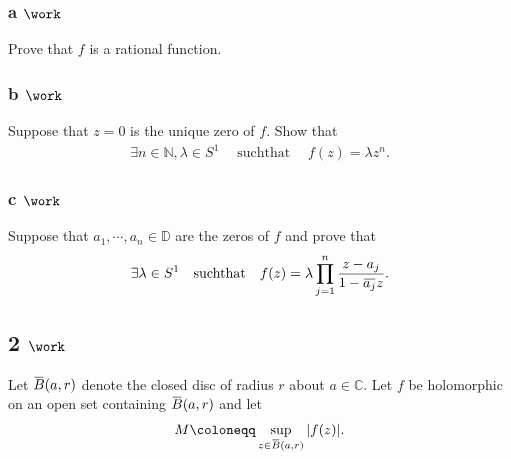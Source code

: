 \hypertarget{a-work-5}{%
\subsubsection{\texorpdfstring{a
\(\work\)}{a \textbackslash work}}\label{a-work-5}}

Prove that \(f\) is a rational function.

\hypertarget{b-work-7}{%
\subsubsection{\texorpdfstring{b
\(\work\)}{b \textbackslash work}}\label{b-work-7}}

Suppose that \(z=0\) is the unique zero of \(f\). Show that
\begin{align*}  
\exists n\in {\mathbb{N}}, \lambda \in S^1 {\quad \operatorname{ such that } \quad}f(z) = \lambda z^n
.\end{align*}

\hypertarget{c-work-5}{%
\subsubsection{\texorpdfstring{c
\(\work\)}{c \textbackslash work}}\label{c-work-5}}

Suppose that \(a_1, \cdots, a_n \in {\mathbb{D}}\) are the zeros of
\(f\) and prove that
\begin{align*}  
\exists \lambda \in S^1 {\quad \operatorname{such that} \quad} f(z) = \lambda \prod_{j=1}^n {z - a_j \over 1 - \mkern 1.5mu\overline{\mkern-1.5mua_j\mkern-1.5mu}\mkern 1.5mu z}
.\end{align*}

\hypertarget{work-68}{%
\subsection{\texorpdfstring{2
\(\work\)}{2 \textbackslash work}}\label{work-68}}

Let
\(\mkern 1.5mu\overline{\mkern-1.5muB\mkern-1.5mu}\mkern 1.5mu(a, r)\)
denote the closed disc of radius \(r\) about \(a\in {\mathbb{C}}\). Let
\(f\) be holomorphic on an open set containing
\(\mkern 1.5mu\overline{\mkern-1.5muB\mkern-1.5mu}\mkern 1.5mu(a, r)\)
and let
\begin{align*}  
M \coloneqq\sup_{z\in \mkern 1.5mu\overline{\mkern-1.5muB\mkern-1.5mu}\mkern 1.5mu(a, r)} {\left\lvert {f(z)} \right\rvert}
.\end{align*}


